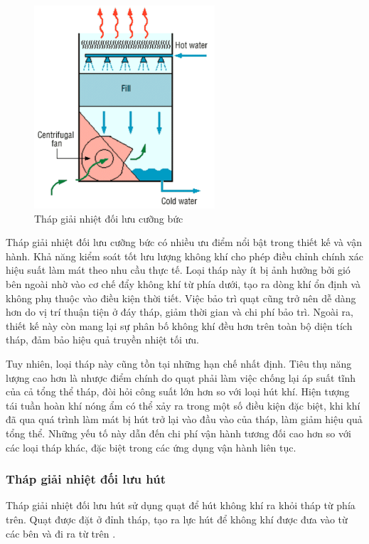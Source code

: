 \documentclass[../main.tex]{subfiles}
\begin{document}
\begin{figure}[H]
    \centering
    \includegraphics[width=0.6\textwidth]{Hinhve/doi_luu_cuong_buc.png}
    \caption{Tháp giải nhiệt đối lưu cưỡng bức \cite{unep2006coolingtower_en}}
    \label{fig:doi_luu_cuong_buc}
\end{figure}

Tháp giải nhiệt đối lưu cưỡng bức có nhiều ưu điểm nổi bật trong thiết kế và vận hành. Khả năng kiểm soát tốt lưu lượng không khí cho phép điều chỉnh chính xác hiệu suất làm mát theo nhu cầu thực tế. Loại tháp này ít bị ảnh hưởng bởi gió bên ngoài nhờ vào cơ chế đẩy không khí từ phía dưới, tạo ra dòng khí ổn định và không phụ thuộc vào điều kiện thời tiết. Việc bảo trì quạt cũng trở nên dễ dàng hơn do vị trí thuận tiện ở đáy tháp, giảm thời gian và chi phí bảo trì. Ngoài ra, thiết kế này còn mang lại sự phân bố không khí đều hơn trên toàn bộ diện tích tháp, đảm bảo hiệu quả truyền nhiệt tối ưu.

Tuy nhiên, loại tháp này cũng tồn tại những hạn chế nhất định. Tiêu thụ năng lượng cao hơn là nhược điểm chính do quạt phải làm việc chống lại áp suất tĩnh của cả tổng thể tháp, đòi hỏi công suất lớn hơn so với loại hút khí. Hiện tượng tái tuần hoàn khí nóng ẩm có thể xảy ra trong một số điều kiện đặc biệt, khi khí đã qua quá trình làm mát bị hút trở lại vào đầu vào của tháp, làm giảm hiệu quả tổng thể. Những yếu tố này dẫn đến chi phí vận hành tương đối cao hơn so với các loại tháp khác, đặc biệt trong các ứng dụng vận hành liên tục.

\subsubsection{Tháp giải nhiệt đối lưu hút}
Tháp giải nhiệt đối lưu hút sử dụng quạt để hút không khí ra khỏi tháp từ phía trên. Quạt được đặt ở đỉnh tháp, tạo ra lực hút để không khí được đưa vào từ các bên và đi ra từ trên \cite{johnson_mechanical_draft_2016}.
\end{document}
